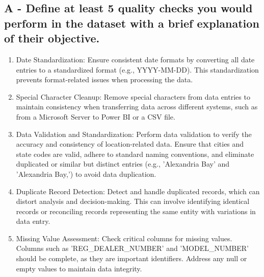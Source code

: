 \documentclass[a4paper, 12pt]{article}
\begin{document}
\subsection{A - Define at least 5 quality checks you would perform in the dataset with a brief explanation of their objective.}

\begin{enumerate}
	\item Date Standardization: Ensure consistent date formats by converting all date entries to a standardized format (e.g., YYYY-MM-DD). This standardization prevents format-related issues when processing the data.
	
	\item Special Character Cleanup: Remove special characters from data entries to maintain consistency when transferring data across different systems, such as from a Microsoft Server to Power BI or a CSV file.
	
	\item Data Validation and Standardization: Perform data validation to verify the accuracy and consistency of location-related data. Ensure that cities and state codes are valid, adhere to standard naming conventions, and eliminate duplicated or similar but distinct entries (e.g., 'Alexandria Bay' and 'Alexandria Bay,') to avoid data duplication.
	
	\item Duplicate Record Detection: Detect and handle duplicated records, which can distort analysis and decision-making. This can involve identifying identical records or reconciling records representing the same entity with variations in data entry.
	
	\item Missing Value Assessment: Check critical columns for missing values. Columns such as 'REG\_DEALER\_NUMBER' and 'MODEL\_NUMBER' should be complete, as they are important identifiers. Address any null or empty values to maintain data integrity.
\end{enumerate}
\end{document}
